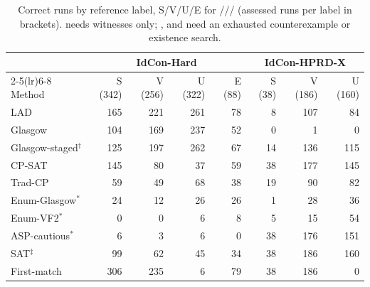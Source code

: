 \begin{table}[t]
\caption{Correct runs by reference label, S/V/U/E for \Sat/\Vio/\Unk/\Emp{} (assessed runs per label in brackets). \Unk{} needs witnesses only; \Sat{}, \Vio{} and \Emp{} need an exhausted counterexample or existence search.}
\label{tab:labels}
\centering\footnotesize
\setlength{\tabcolsep}{2.4pt}
\begin{tabular}{lrrrr rrr}
\toprule
 & \multicolumn{4}{c}{IdCon-Hard} & \multicolumn{3}{c}{IdCon-HPRD-X}\\
\cmidrule(lr){2-5}\cmidrule(lr){6-8}
Method & S (342) & V (256) & U (322) & E (88) & S (38) & V (186) & U (160)\\
\midrule
LAD & 165 & 221 & 261 & 78 & 8 & 107 & 84\\
Glasgow & 104 & 169 & 237 & 52 & 0 & 1 & 0\\
Glasgow-staged$^\dagger$ & 125 & 197 & 262 & 67 & 14 & 136 & 115\\
CP-SAT & 145 & 80 & 37 & 59 & 38 & 177 & 145\\
Trad-CP & 59 & 49 & 68 & 38 & 19 & 90 & 82\\
Enum-Glasgow$^\ast$ & 24 & 12 & 26 & 26 & 1 & 28 & 36\\
Enum-VF2$^\ast$ & 0 & 0 & 6 & 8 & 5 & 15 & 54\\
ASP-cautious$^\ast$ & 6 & 3 & 6 & 0 & 38 & 176 & 151\\
SAT$^\ddagger$ & 99 & 62 & 45 & 34 & 38 & 186 & 160\\
\midrule
First-match & 306 & 235 & 6 & 79 & 38 & 186 & 0\\
\bottomrule
\end{tabular}
\end{table}
